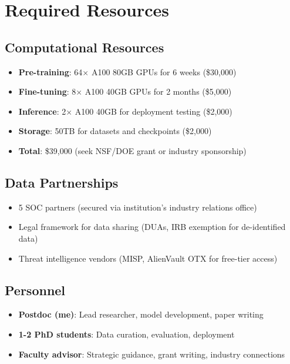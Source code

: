 \documentclass[11pt]{article}
\begin{document}
\section{Required Resources}

\subsection{Computational Resources}

\begin{itemize}
    \item \textbf{Pre-training}: 64$\times$ A100 80GB GPUs for 6 weeks (\$30,000)
    \item \textbf{Fine-tuning}: 8$\times$ A100 40GB GPUs for 2 months (\$5,000)
    \item \textbf{Inference}: 2$\times$ A100 40GB for deployment testing (\$2,000)
    \item \textbf{Storage}: 50TB for datasets and checkpoints (\$2,000)
    \item \textbf{Total}: \$39,000 (seek NSF/DOE grant or industry sponsorship)
\end{itemize}

\subsection{Data Partnerships}

\begin{itemize}
    \item 5 SOC partners (secured via institution's industry relations office)
    \item Legal framework for data sharing (DUAs, IRB exemption for de-identified data)
    \item Threat intelligence vendors (MISP, AlienVault OTX for free-tier access)
\end{itemize}

\subsection{Personnel}

\begin{itemize}
    \item \textbf{Postdoc (me)}: Lead researcher, model development, paper writing
    \item \textbf{1-2 PhD students}: Data curation, evaluation, deployment
    \item \textbf{Faculty advisor}: Strategic guidance, grant writing, industry connections
\end{itemize}
\end{document}
